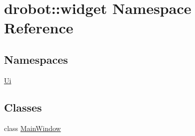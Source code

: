 \hypertarget{namespacedrobot_1_1widget}{\section{drobot\-:\-:widget Namespace Reference}
\label{namespacedrobot_1_1widget}
}
\subsection*{Namespaces}
\begin{DoxyCompactItemize}
\item 
\hyperlink{namespacedrobot_1_1widget_1_1Ui}{Ui}
\end{DoxyCompactItemize}
\subsection*{Classes}
\begin{DoxyCompactItemize}
\item 
class \hyperlink{classdrobot_1_1widget_1_1MainWindow}{Main\-Window}
\end{DoxyCompactItemize}
